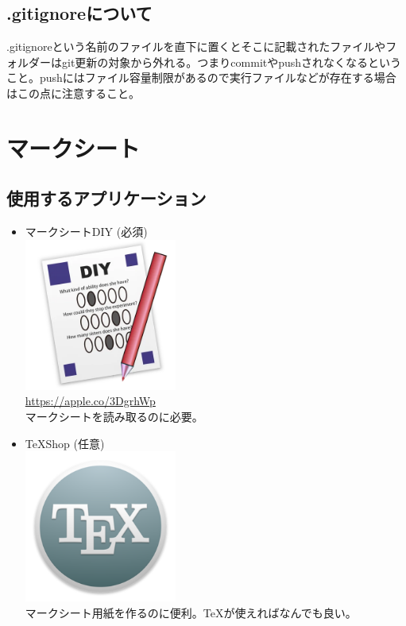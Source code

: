 \documentclass[dvipdfmx,jb5]{jreport}
\begin{document}
\subsection{.gitignoreについて}\label{sec:gitignore}
.gitignoreという名前のファイルを直下に置くとそこに記載されたファイルやフォルダーはgit更新の対象から外れる。つまりcommitやpushされなくなるということ。pushにはファイル容量制限があるので実行ファイルなどが存在する場合はこの点に注意すること。
\section{マークシート}
\subsection{使用するアプリケーション}
\begin{itemize}
      \item マークシートDIY {\color{red}(必須)}\\
            \includegraphics[width=5cm]{assets/answersheet-diy.png}\\
            \url{https://apple.co/3DgrhWp}\\
            マークシートを読み取るのに必要。
      \item \TeX Shop (任意)\\
            \includegraphics[width=5cm]{assets/TeX.png}\\
            マークシート用紙を作るのに便利。\TeX が使えればなんでも良い。
\end{itemize}
\end{document}

